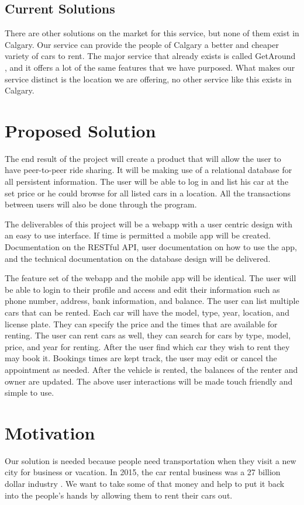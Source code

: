 \documentclass{article}
\begin{document}
\subsection{Current Solutions}
There are other solutions on the market for this service, but none of them exist in Calgary.
Our service can provide the people of Calgary a better and cheaper variety of cars to rent.
The major service that already exists is called GetAround \cite{getaround}, and it offers a lot of the same
features that we have purposed.
What makes our service distinct is the location we are offering, no other service like this exists in Calgary.

\section{Proposed Solution}
The end result of the project will create a product that will allow the user to have peer-to-peer ride sharing. It will be making use of a relational database for all persistent information.
The user will be able to log in and list his car at the set price or he could browse for all listed cars in a location.
All the transactions between users will also be done through the program.

The deliverables of this project will be a webapp with a user centric design with an easy to use interface. If time is permitted a mobile app will be created. Documentation on the RESTful API, user documentation on how to use the app, and the technical documentation on the database design will be delivered.

The feature set of the webapp and the mobile app will be identical.
The user will be able to login to their profile and access and edit their information such as phone number, address, bank information, and balance.
The user can list multiple cars that can be rented. Each car will have the model, type, year, location, and license plate. They can specify the price and the times that are available for renting.
The user can rent cars as well, they can search for cars by type, model, price, and year for renting. After the user find which car they wish to rent they may book it.
Bookings times are kept track, the user may edit or cancel the appointment as needed.
After the vehicle is rented, the balances of the renter and owner are updated.
The above user interactions will be made touch friendly and simple to use.

\section{Motivation}
Our solution is needed because people need transportation when they visit a new
city for business or vacation. In 2015, the car rental business was a 27
billion dollar industry \cite{marketdata}. We want to take some of that money
and help to put it back into the people's hands by allowing them to rent their
cars out.
\end{document}
